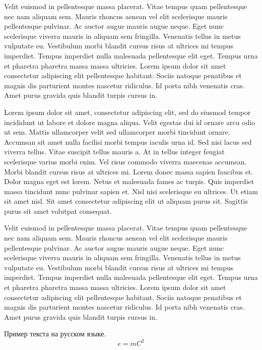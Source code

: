\documentclass[draft]{G7-32-2017}
\begin{document}
Velit euismod in pellentesque massa placerat. Vitae tempus quam pellentesque nec nam aliquam sem. Mauris rhoncus aenean vel elit scelerisque mauris pellentesque pulvinar. Ac auctor augue mauris augue neque. Eget nunc scelerisque viverra mauris in aliquam sem fringilla. Venenatis tellus in metus vulputate eu. Vestibulum morbi blandit cursus risus at ultrices mi tempus imperdiet. Tempus imperdiet nulla malesuada pellentesque elit eget. Tempus urna et pharetra pharetra massa massa ultricies. Lorem ipsum dolor sit amet consectetur adipiscing elit pellentesque habitant. Sociis natoque penatibus et magnis dis parturient montes nascetur ridiculus. Id porta nibh venenatis cras. Amet purus gravida quis blandit turpis cursus in.

Lorem ipsum dolor sit amet, consectetur adipiscing elit, sed do eiusmod tempor incididunt ut labore et dolore magna aliqua. Velit egestas dui id ornare arcu odio ut sem. Mattis ullamcorper velit sed ullamcorper morbi tincidunt ornare. Accumsan sit amet nulla facilisi morbi tempus iaculis urna id. Sed nisi lacus sed viverra tellus. Vitae suscipit tellus mauris a. At in tellus integer feugiat scelerisque varius morbi enim. Vel risus commodo viverra maecenas accumsan. Morbi blandit cursus risus at ultrices mi. Lorem donec massa sapien faucibus et. Dolor magna eget est lorem. Netus et malesuada fames ac turpis. Quis imperdiet massa tincidunt nunc pulvinar sapien et. Nisl nisi scelerisque eu ultrices. Ut etiam sit amet nisl. Sit amet consectetur adipiscing elit ut aliquam purus sit. Sagittis purus sit amet volutpat consequat.

Velit euismod in pellentesque massa placerat. Vitae tempus quam pellentesque nec nam aliquam sem. Mauris rhoncus aenean vel elit scelerisque mauris pellentesque pulvinar. Ac auctor augue mauris augue neque. Eget nunc scelerisque viverra mauris in aliquam sem fringilla. Venenatis tellus in metus vulputate eu. Vestibulum morbi blandit cursus risus at ultrices mi tempus imperdiet. Tempus imperdiet nulla malesuada pellentesque elit eget. Tempus urna et pharetra pharetra massa massa ultricies. Lorem ipsum dolor sit amet consectetur adipiscing elit pellentesque habitant. Sociis natoque penatibus et magnis dis parturient montes nascetur ridiculus. Id porta nibh venenatis cras. Amet purus gravida quis blandit turpis cursus in.

Пример текста на русском языке.
\begin{equation}
    \label{ex:eq:1}
    e = mC^2
\end{equation}
\end{document}
